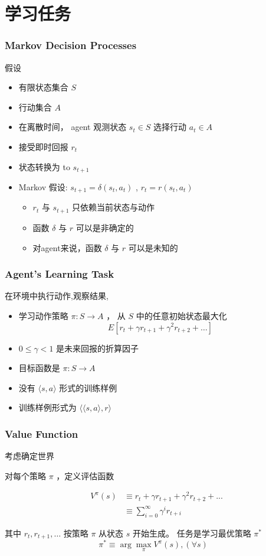 \documentclass{beamer}
\begin{document}
\section{学习任务}
\label{sec-2}
\begin{frame}
\frametitle{Markov Decision Processes}
\label{sec-2-1}


假设
\begin{itemize}
\item 有限状态集合 $S$
\item 行动集合 $A$
\item 在离散时间， agent 观测状态  $s_t \in S$ 选择行动 $a_t \in A$
\item 接受即时回报 $r_t$
\item 状态转换为 to $s_{t+1}$
\item Markov 假设:  $s_{t+1} = \delta(s_t, a_t)$ ,  $r_t = r(s_t,a_t)$
\begin{itemize}
\item $r_t$ 与 $s_{t+1}$ 只依赖当前状态与动作
\item 函数 $\delta$ 与 $r$ 可以是非确定的
\item 对agent来说，函数 $\delta$ 与 $r$ 可以是未知的
\end{itemize}
\end{itemize}
\end{frame}
\begin{frame}
\frametitle{Agent's Learning Task}
\label{sec-2-2}


在环境中执行动作,观察结果, 
\begin{itemize}
\item 学习动作策略 $\pi : S \rightarrow A$ ，   从 $S$ 中的任意初始状态最大化
    $$E[r_t + \gamma r_{t+1} + \gamma^2 r_{t+2} + \ldots ]$$
\item $0 \leq \gamma < 1$ 是未来回报的折算因子
\item 目标函数是  $\pi : S \rightarrow A$
\item 没有  $\langle s, a \rangle$ 形式的训练样例
\item 训练样例形式为 $\langle \langle  s, a \rangle , r \rangle$
\end{itemize}
\end{frame}
\begin{frame}
\frametitle{Value Function}
\label{sec-2-3}


考虑确定世界

对每个策略 $\pi$ ，定义评估函数

\begin{eqnarray}
 & V^{\pi}(s) & \equiv r_{t} + \gamma r_{t+1} + \gamma^{2} r_{t+2} + ...
\nonumber \\ 
& & \equiv \sum_{i=0}^{\infty} \gamma^{i} r_{t+i} \nonumber
\end{eqnarray}

其中 $r_{t}, r_{t+1}, \ldots$ 按策略 $\pi$ 从状态 $s$ 开始生成。
任务是学习最优策略 $\pi^{*}$ $$\pi^{*} \equiv \arg\max_{\pi} V^{\pi}(s), (\forall s)$$
\end{frame}
\end{document}
